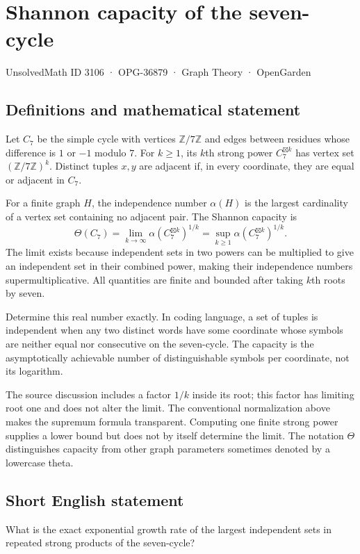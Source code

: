 \documentclass[11pt,a4paper]{article}
\begin{document}
\section*{Shannon capacity of the seven-cycle}\label{3106}
{\small UnsolvedMath ID 3106 · OPG-36879 · Graph Theory · OpenGarden}
\subsection{Definitions and mathematical statement}
Let $C_7$ be the simple cycle with vertices $\mathbb Z/7\mathbb Z$ and
edges between residues whose difference is $1$ or $-1$ modulo $7$.
For $k\ge1$, its $k$th strong power $C_7^{\boxtimes k}$ has vertex set
$(\mathbb Z/7\mathbb Z)^k$. Distinct tuples $x,y$ are adjacent if,
in every coordinate, they are equal or adjacent in $C_7$.

For a finite graph $H$, the independence number $\alpha(H)$ is the
largest cardinality of a vertex set containing no adjacent pair.
The Shannon capacity is
\[
 \Theta(C_7)=\lim_{k\to\infty}
       \alpha(C_7^{\boxtimes k})^{1/k}
       =\sup_{k\ge1}\alpha(C_7^{\boxtimes k})^{1/k}.
\]
The limit exists because independent sets in two powers can be multiplied
to give an independent set in their combined power, making their
independence numbers supermultiplicative. All quantities are finite and
bounded after taking $k$th roots by seven.

Determine this real number exactly. In coding language, a set of tuples
is independent when any two distinct words have some coordinate whose
symbols are neither equal nor consecutive on the seven-cycle.
The capacity is the asymptotically achievable number of distinguishable
symbols per coordinate, not its logarithm.

The source discussion includes a factor $1/k$ inside its root; this
factor has limiting root one and does not alter the limit. The conventional
normalization above makes the supremum formula transparent. Computing one
finite strong power supplies a lower bound but does not by itself
determine the limit. The notation $\Theta$ distinguishes capacity from
other graph parameters sometimes denoted by a lowercase theta.
\subsection{Short English statement}
What is the exact exponential growth rate of the largest independent sets in repeated strong products of the seven-cycle?
\end{document}
